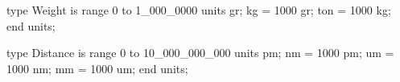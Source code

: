 type Weight is range 0 to 1_000_0000
    units
        gr;
        kg = 1000 gr;
        ton = 1000 kg;
    end units;

type Distance is range 0 to 10_000_000_000
    units
        pm;
        nm = 1000 pm;
        um = 1000 nm;
        mm = 1000 um;
    end units;